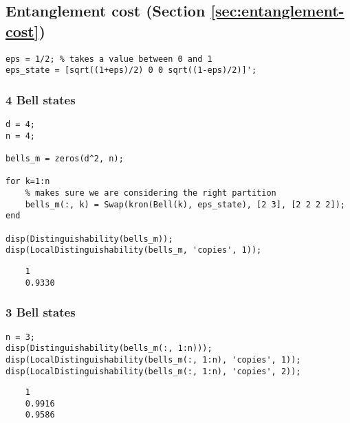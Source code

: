 \subsection*{Entanglement cost (Section \ref{sec:entanglement-cost})} 

\begin{verbatim}
eps = 1/2; % takes a value between 0 and 1
eps_state = [sqrt((1+eps)/2) 0 0 sqrt((1-eps)/2)]';
\end{verbatim}


\subsubsection*{4 Bell states}

\begin{verbatim}
d = 4;
n = 4;

bells_m = zeros(d^2, n);

for k=1:n
    % makes sure we are considering the right partition
    bells_m(:, k) = Swap(kron(Bell(k), eps_state), [2 3], [2 2 2 2]);
end

disp(Distinguishability(bells_m));
disp(LocalDistinguishability(bells_m, 'copies', 1));
\end{verbatim}\color{lightgray}\begin{verbatim}     
    1
    0.9330
\end{verbatim} 
\color{black}
    
\subsubsection*{3 Bell states}

\begin{verbatim}
n = 3;
disp(Distinguishability(bells_m(:, 1:n)));
disp(LocalDistinguishability(bells_m(:, 1:n), 'copies', 1));
disp(LocalDistinguishability(bells_m(:, 1:n), 'copies', 2));
\end{verbatim}
\color{lightgray} 
\begin{verbatim}     
    1
    0.9916
    0.9586
\end{verbatim} \color{black}

